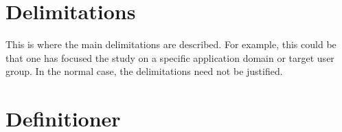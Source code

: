 \section{Delimitations}
\label{sec:delimitations}

This is where the main delimitations are described. For
example, this could be that one has focused the study on a
specific application domain or target user group. In the
normal case, the delimitations need not be justified.

\section{Definitioner} %
\label{sec:definitions}
\begin{enumerate}[leftmargin=5cm]
\end{enumerate}
